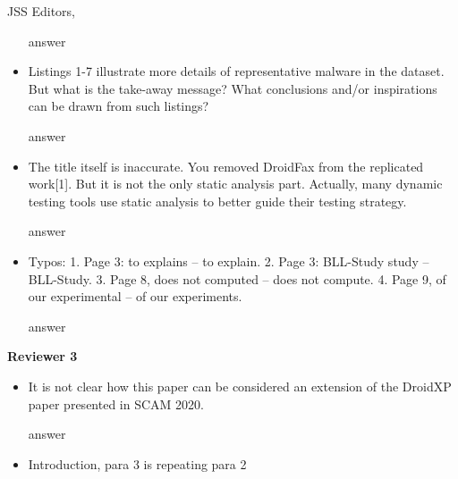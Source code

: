 \documentclass{letter}
\begin{document}
\begin{letter}{JSS Editors,}
\begin{itemize}
\vspace{0.2cm}

{\color{blue}{\bf Answer:} answer}

\vspace{0.2cm}

\item Listings 1-7 illustrate more details of representative malware in the dataset. But what is the take-away message? What 
conclusions and/or inspirations can be drawn from such listings?


\vspace{0.2cm}

{\color{blue}{\bf Answer:} answer}

\vspace{0.2cm}

\item The title itself is inaccurate. You removed DroidFax from the replicated work[1]. But it is not the only static analysis part. 
Actually, many dynamic testing tools use static analysis to better guide their testing strategy.


\vspace{0.2cm}

{\color{blue}{\bf Answer:} answer}

\vspace{0.2cm}

\item Typos:
1. Page 3: to explains -- to explain.
2. Page 3: BLL-Study study -- BLL-Study.
3. Page 8, does not computed -- does not compute.
4. Page 9, of our experimental -- of our experiments.


\vspace{0.2cm}

{\color{blue}{\bf Answer:} answer}

\end{itemize}

{\bf Reviewer 3}

\begin{itemize}

\item It is not clear how this paper can be considered an extension of the DroidXP paper presented in SCAM 2020.


\vspace{0.2cm}

{\color{blue}{\bf Answer:} answer}

\vspace{0.2cm}

\item Introduction, para 3 is repeating para 2



\end{itemize}
\end{letter}
\end{document}
